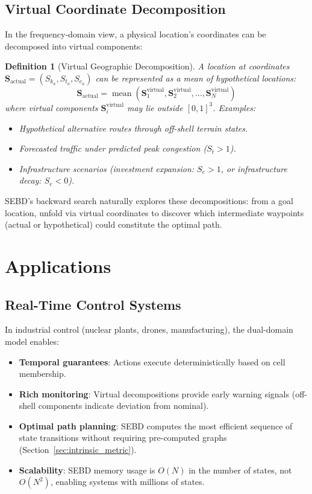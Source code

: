 \documentclass[twocolumn,11pt,a4paper]{article}
\newtheorem{definition}[theorem]{Definition}
\newcommand{\Sk}{S_{k}}
\newcommand{\St}{S_{t}}
\newcommand{\Se}{S_{e}}
\newcommand{\Stuple}{\mathbf{S}}
\DeclareMathOperator{\mean}{mean}
\begin{document}
\subsection{Virtual Coordinate Decomposition}

In the frequency-domain view, a physical location's coordinates can be decomposed into virtual components:

\begin{definition}[Virtual Geographic Decomposition]
A location at coordinates $\Stuple_{\text{actual}} = (\Sk_a, \St_a, \Se_a)$ can be represented as a mean of hypothetical locations:
\begin{equation}
\Stuple_{\text{actual}} = \mean(\Stuple_1^{\text{virtual}}, \Stuple_2^{\text{virtual}}, \ldots, \Stuple_N^{\text{virtual}})
\end{equation}
where virtual components $\Stuple_i^{\text{virtual}}$ may lie outside $[0,1]^3$. Examples:
\begin{itemize}[nosep]
  \item Hypothetical alternative routes through off-shell terrain states.
  \item Forecasted traffic under predicted peak congestion ($\St > 1$).
  \item Infrastructure scenarios (investment expansion: $\Se > 1$, or infrastructure decay: $\Se < 0$).
\end{itemize}
\end{definition}

SEBD's backward search naturally explores these decompositions: from a goal location, unfold via virtual coordinates to discover which intermediate waypoints (actual or hypothetical) could constitute the optimal path.

\section{Applications}
\label{sec:applications}

\subsection{Real-Time Control Systems}

In industrial control (nuclear plants, drones, manufacturing), the dual-domain model enables:
\begin{itemize}[nosep,leftmargin=1em]
  \item \textbf{Temporal guarantees}: Actions execute deterministically based on cell membership.
  \item \textbf{Rich monitoring}: Virtual decompositions provide early warning signals (off-shell components indicate deviation from nominal).
  \item \textbf{Optimal path planning}: SEBD computes the most efficient sequence of state transitions without requiring pre-computed graphs (Section~\ref{sec:intrinsic_metric}).
  \item \textbf{Scalability}: SEBD memory usage is $O(N)$ in the number of states, not $O(N^2)$, enabling systems with millions of states.
\end{itemize}
\end{document}
